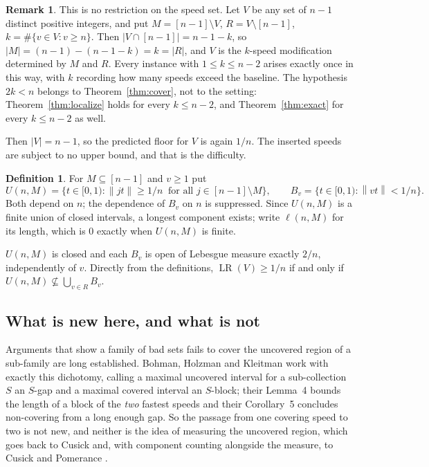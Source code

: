 \documentclass[11pt]{amsart}
\theoremstyle{plain}
\theoremstyle{definition}
\newtheorem{definition}[theorem]{Definition}
\newtheorem{remark}[theorem]{Remark}
\newcommand{\LR}{\operatorname{LR}}
\newcommand{\nrm}[1]{\left\lVert #1 \right\rVert}
\begin{document}
\begin{remark}\label{rem:general}
This is no restriction on the speed set. Let $V$ be any set of $n-1$ distinct positive integers, and
put $M=[n-1]\setminus V$, $R=V\setminus[n-1]$, $k=\#\{v\in V:v\ge n\}$. Then $|V\cap[n-1]|=n-1-k$, so
$|M|=(n-1)-(n-1-k)=k=|R|$, and $V$ is the $k$-speed modification determined by $M$ and $R$. Every
instance with $1\le k\le n-2$ arises exactly once in this way, with $k$ recording how
many speeds exceed the baseline. The hypothesis $2k<n$ belongs to Theorem~\ref{thm:cover}, not to the
setting: Theorem~\ref{thm:localize} holds for every $k\le n-2$, and Theorem~\ref{thm:exact} for
every $k\le n-2$ as well.
\end{remark}

Then $|V|=n-1$, so the predicted floor for $V$ is again $1/n$. The inserted speeds are subject to no
upper bound, and that is the difficulty.

\begin{definition}\label{def:U}
For $M\subseteq[n-1]$ and $v\ge1$ put
\[
  U(n,M)=\bigl\{t\in[0,1):\nrm{jt}\ge 1/n \ \text{ for all } j\in[n-1]\setminus M\bigr\},
  \qquad
  B_v=\bigl\{t\in[0,1):\nrm{vt}<1/n\bigr\}.
\]
Both depend on $n$; the dependence of $B_v$ on $n$ is suppressed. Since $U(n,M)$ is a finite union
of closed intervals, a longest component exists; write $\ell(n,M)$ for its length, which is $0$
exactly when $U(n,M)$ is finite.
\end{definition}

$U(n,M)$ is closed and each $B_v$ is open of Lebesgue measure exactly $2/n$, independently of $v$.
Directly from the definitions, $\LR(V)\ge 1/n$ if and only if
$U(n,M)\not\subseteq\bigcup_{v\in R}B_v$.

\subsection*{What is new here, and what is not}

Arguments that show a family of bad sets fails to cover the uncovered region of a sub-family are
long established. Bohman, Holzman and Kleitman \cite{bhk} work with exactly this dichotomy, calling
a maximal uncovered interval for a sub-collection $S$ an $S$-gap and a maximal covered interval an
$S$-block; their Lemma~4 bounds the length of a block of the \emph{two} fastest speeds and their
Corollary~5 concludes non-covering from a long enough gap. So the passage from one covering speed to
two is not new, and neither is the idea of measuring the uncovered region, which goes back to
Cusick \cite{cusick74} and, with component counting alongside the measure, to Cusick and Pomerance
\cite{cp}.
\end{document}
